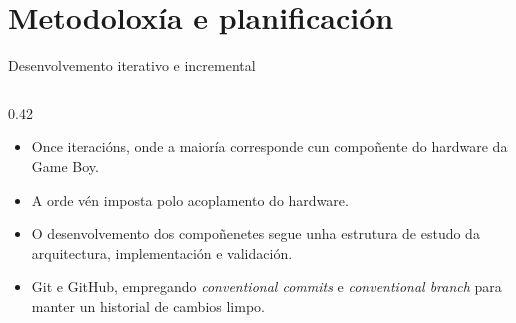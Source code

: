 \section{Metodoloxía e planificación}

\begin{frame}{Desenvolvemento iterativo e incremental}
  \begin{columns}[c]
    \begin{column}{0.42\textwidth}
      \small
      \begin{itemize}
        \item Once iteracións, onde a maioría corresponde cun
        compoñente do hardware da Game Boy.

        \item A orde vén imposta polo acoplamento do hardware.

        \item O desenvolvemento dos compoñenetes segue unha estrutura de estudo da arquitectura, implementación
          e validación.

        \item Git e GitHub, empregando \textit{conventional commits} e \textit{conventional branch}
        para manter un historial de cambios limpo.


\end{itemize}
\end{column}
\end{columns}
\end{frame}

